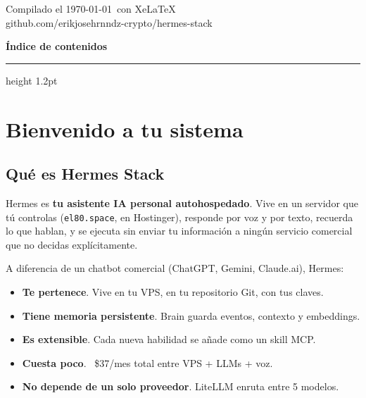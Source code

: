 \documentclass[11pt,a4paper]{article}
\begin{document}
\vspace{2.5cm}
\begin{center}
{\small\sffamily\color{manualgold}
Compilado el \today\ con XeLaTeX\\
github.com/erikjosehrnndz-crypto/hermes-stack}
\end{center}

\newpage

\thispagestyle{fancy}
{\color{manualgreen}\sffamily\Large\bfseries Índice de contenidos}\\[4pt]
{\color{manualgold}\hrule height 1.2pt}
\vspace{12pt}
\setcounter{tocdepth}{2}
\tableofcontents

\newpage

\section{Bienvenido a tu sistema}

\subsection{Qué es Hermes Stack}

Hermes es \textbf{tu asistente IA personal autohospedado}. Vive en un servidor que tú controlas (\texttt{el80.space}, en Hostinger), responde por voz y por texto, recuerda lo que hablan, y se ejecuta sin enviar tu información a ningún servicio comercial que no decidas explícitamente.

A diferencia de un chatbot comercial (ChatGPT, Gemini, Claude.ai), Hermes:

\begin{itemize}[leftmargin=*,itemsep=2pt]
\item \textbf{Te pertenece}. Vive en tu VPS, en tu repositorio Git, con tus claves.
\item \textbf{Tiene memoria persistente}. Brain guarda eventos, contexto y embeddings.
\item \textbf{Es extensible}. Cada nueva habilidad se añade como un skill MCP.
\item \textbf{Cuesta poco}. ~\$37/mes total entre VPS + LLMs + voz.
\item \textbf{No depende de un solo proveedor}. LiteLLM enruta entre 5 modelos.
\end{itemize}
\end{document}
